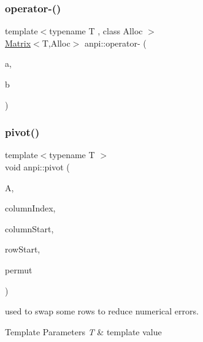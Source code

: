 \mbox{\label{namespaceanpi_a96bd9f3072f6ea35a1d8b5a3f2ff09ae}} 
\subsubsection{\texorpdfstring{operator-\/()}{operator-()}}
{\footnotesize\ttfamily template$<$typename T , class Alloc $>$ \\
\hyperlink{classanpi_1_1Matrix}{Matrix}$<$T,Alloc$>$ anpi\+::operator-\/ (\begin{DoxyParamCaption}\item[{const \hyperlink{classanpi_1_1Matrix}{Matrix}$<$ T, Alloc $>$ \&}]{a,  }\item[{const \hyperlink{classanpi_1_1Matrix}{Matrix}$<$ T, Alloc $>$ \&}]{b }\end{DoxyParamCaption})}

\mbox{\label{namespaceanpi_a28b5b58719a454e2a5e8343a9c035d06}} 
\subsubsection{\texorpdfstring{pivot()}{pivot()}}
{\footnotesize\ttfamily template$<$typename T $>$ \\
void anpi\+::pivot (\begin{DoxyParamCaption}\item[{\hyperlink{classanpi_1_1Matrix}{Matrix}$<$ T $>$ \&}]{A,  }\item[{size\+\_\+t}]{column\+Index,  }\item[{size\+\_\+t}]{column\+Start,  }\item[{size\+\_\+t}]{row\+Start,  }\item[{std\+::vector$<$ size\+\_\+t $>$ \&}]{permut }\end{DoxyParamCaption})}



used to swap some rows to reduce numerical errors. 


\begin{DoxyTemplParams}{Template Parameters}
{\em T} & template value \\
\hline
\end{DoxyTemplParams}

